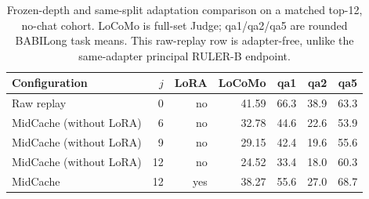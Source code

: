 \begin{table}[htbp]
\centering
\small
\setlength{\tabcolsep}{4pt}
\begin{tabular}{@{}lrrrrrr@{}}
\toprule
Configuration & $j$ & LoRA & LoCoMo & qa1 & qa2 & qa5 \\
\midrule
Raw replay & 0 & no & 41.59 & 66.3 & 38.9 & 63.3 \\
MidCache (without LoRA) & 6 & no & 32.78 & 44.6 & 22.6 & 53.9 \\
MidCache (without LoRA) & 9 & no & 29.15 & 42.4 & 19.6 & 55.6 \\
MidCache (without LoRA) & 12 & no & 24.52 & 33.4 & 18.0 & 60.3 \\
MidCache & 12 & yes & 38.27 & 55.6 & 27.0 & 68.7 \\
\bottomrule
\end{tabular}
\caption{Frozen-depth and same-split adaptation comparison on a matched top-12, no-chat cohort. LoCoMo is full-set Judge; qa1/qa2/qa5 are rounded BABILong task means. This raw-replay row is adapter-free, unlike the same-adapter principal RULER-B endpoint.}
\label{tab:frozen-depth}
\end{table}
